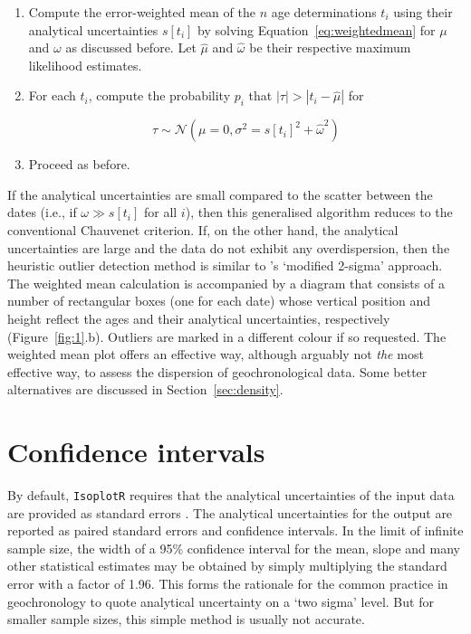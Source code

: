 \documentclass{article}
\begin{document}
\begin{enumerate}
\item Compute the error-weighted mean of the $n$ age determinations
  $t_i$ using their analytical uncertainties $s[t_i]$ by solving
  Equation~\ref{eq:weightedmean} for $\mu$ and $\omega$ as discussed
  before. Let $\hat{\mu}$ and $\hat{\omega}$ be their respective
  maximum likelihood estimates.
\item For each $t_i$, compute the probability $p_i$ that
  $|\tau|>|t_i-\hat{\mu}|$ for

  \[
  \tau \sim \mathcal{N}(\mu=0,\sigma^2 = s[t_i]^2+\hat{\omega}^2)
  \]
\item Proceed as before.
\end{enumerate}

If the analytical uncertainties are small compared to the scatter
between the dates (i.e., if $\omega \gg s[t_i]$ for all $i$), then
this generalised algorithm reduces to the conventional Chauvenet
criterion. If, on the other hand, the analytical uncertainties are
large and the data do not exhibit any overdispersion, then the
heuristic outlier detection method is similar to \citet{ludwig2003}'s
`modified 2-sigma' approach.\\

The weighted mean calculation is accompanied by a diagram that
consists of a number of rectangular boxes (one for each date) whose
vertical position and height reflect the ages and their analytical
uncertainties, respectively (Figure~\ref{fig:1}.b).  Outliers are
marked in a different colour if so requested. The weighted mean plot
offers an effective way, although arguably not \emph{the} most
effective way, to assess the dispersion of geochronological data. Some
better alternatives are discussed in Section~\ref{sec:density}.

\section{Confidence intervals}
\label{sec:confidence}

By default, \texttt{IsoplotR} requires that the analytical
uncertainties of the input data are provided as standard errors
\citep[\emph{sensu}][p.187]{kenney1954}.  The analytical uncertainties
for the output are reported as paired standard errors and confidence
intervals. In the limit of infinite sample size, the width of a 95\%
confidence interval for the mean, slope and many other statistical
estimates may be obtained by simply multiplying the standard error
with a factor of 1.96.  This forms the rationale for the common
practice in geochronology to quote analytical uncertainty on a `two
sigma' level.  But for smaller sample sizes, this simple method is
usually not accurate.\\
\end{document}
